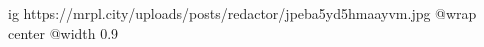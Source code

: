  
 
 
 
 

\ifcmt
  ig https://mrpl.city/uploads/posts/redactor/jpeba5yd5hmaayvm.jpg
  @wrap center
  @width 0.9
\fi
